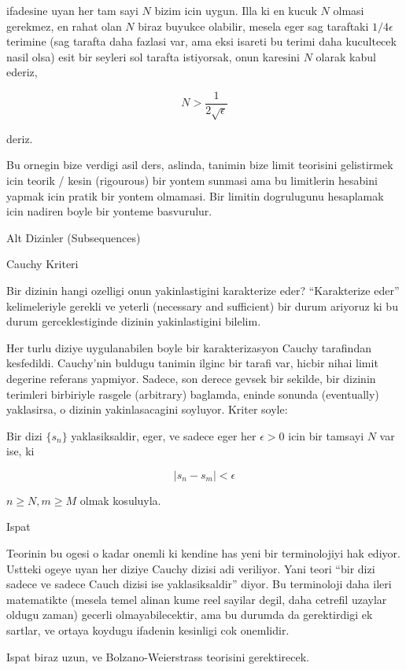 \documentclass[12pt,fleqn]{article}
\begin{document}
ifadesine uyan her tam sayi $N$ bizim icin uygun. Illa ki en kucuk $N$
olmasi gerekmez, en rahat olan $N$ biraz buyukce olabilir, mesela eger sag
taraftaki $1/4\epsilon$ terimine (sag tarafta daha fazlasi var, ama eksi
isareti bu terimi daha kucultecek nasil olsa) esit bir seyleri sol tarafta
istiyorsak, onun karesini $N$ olarak kabul ederiz,

\[ N > \frac{1}{2\sqrt{\epsilon}} \]

deriz. 

Bu ornegin bize verdigi asil ders, aslinda, tanimin bize limit teorisini
gelistirmek icin teorik / kesin (rigourous) bir yontem sunmasi ama bu
limitlerin hesabini yapmak icin pratik bir yontem olmamasi. Bir limitin
dogrulugunu hesaplamak icin nadiren boyle bir yonteme basvurulur. 

Alt Dizinler (Subsequences) 



Cauchy Kriteri 

Bir dizinin hangi ozelligi onun yakinlastigini karakterize eder?
``Karakterize eder'' kelimeleriyle gerekli ve yeterli (necessary and
sufficient) bir durum ariyoruz ki bu durum gerceklestiginde dizinin
yakinlastigini bilelim. 

Her turlu diziye uygulanabilen boyle bir karakterizasyon Cauchy tarafindan
kesfedildi. Cauchy'nin buldugu tanimin ilginc bir tarafi var, hicbir nihai
limit degerine referans yapmiyor. Sadece, son derece gevsek bir sekilde,
bir dizinin terimleri birbiriyle rasgele (arbitrary) baglamda, eninde
sonunda (eventually) yaklasirsa, o dizinin yakinlasacagini soyluyor. Kriter
soyle:

Bir dizi $\{s_n\}$ yaklasiksaldir, eger, ve sadece eger her $\epsilon > 0$
icin bir tamsayi $N$ var ise, ki 

\[ |s_n - s_m| < \epsilon \]

$n \ge N, m \ge M$ olmak kosuluyla. 

Ispat

Teorinin bu ogesi o kadar onemli ki kendine has yeni bir terminolojiyi hak
ediyor. Ustteki ogeye uyan her diziye Cauchy dizisi adi veriliyor. Yani
teori ``bir dizi sadece ve sadece Cauch dizisi ise yaklasiksaldir''
diyor. Bu terminoloji daha ileri matematikte (mesela temel alinan kume reel
sayilar degil, daha cetrefil uzaylar oldugu zaman) gecerli
olmayabilecektir, ama bu durumda da gerektirdigi ek sartlar, ve ortaya
koydugu ifadenin kesinligi cok onemlidir.

Ispat biraz uzun, ve Bolzano-Weierstrass teorisini gerektirecek. 
\end{document}
